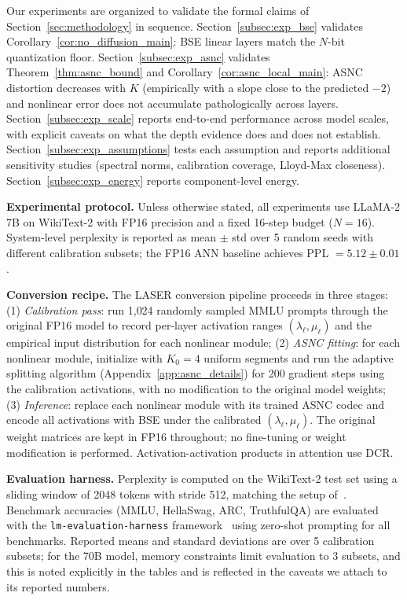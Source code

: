\documentclass{article}
\theoremstyle{plain}
\theoremstyle{definition}
\theoremstyle{remark}
\begin{document}
Our experiments are organized to validate the formal claims of
Section~\ref{sec:methodology} in sequence.
Section~\ref{subsec:exp_bse} validates Corollary~\ref{cor:no_diffusion_main}:
BSE linear layers match the $N$-bit quantization floor.
Section~\ref{subsec:exp_asnc} validates Theorem~\ref{thm:asnc_bound}
and Corollary~\ref{cor:asnc_local_main}: ASNC distortion decreases with $K$
(empirically with a slope close to the predicted $-2$) and nonlinear error does
not accumulate pathologically across layers.
Section~\ref{subsec:exp_scale} reports end-to-end performance across model
scales, with explicit caveats on what the depth evidence does and does not
establish.
Section~\ref{subsec:exp_assumptions} tests each assumption and reports
additional sensitivity studies (spectral norms, calibration coverage, Lloyd-Max
closeness). Section~\ref{subsec:exp_energy} reports component-level energy.

\noindent\textbf{Experimental protocol.}
Unless otherwise stated, all experiments use LLaMA-2 7B on WikiText-2 with FP16
precision and a fixed 16-step budget ($N = 16$). System-level perplexity is
reported as mean $\pm$ std over 5 random seeds with different calibration
subsets; the FP16 ANN baseline achieves PPL $= 5.12 \pm 0.01$.

\noindent\textbf{Conversion recipe.}
The LASER conversion pipeline proceeds in three stages: (1) \emph{Calibration
pass}: run 1{,}024 randomly sampled MMLU prompts through the original FP16
model to record per-layer activation ranges $(\lambda_\ell, \mu_\ell)$ and the
empirical input distribution for each nonlinear module; (2) \emph{ASNC fitting}:
for each nonlinear module, initialize with $K_0 = 4$ uniform segments and run
the adaptive splitting algorithm (Appendix~\ref{app:asnc_details}) for 200
gradient steps using the calibration activations, with no modification to the
original model weights; (3) \emph{Inference}: replace each nonlinear module
with its trained ASNC codec and encode all activations with BSE under the
calibrated $(\lambda_\ell, \mu_\ell)$. The original weight matrices are kept in
FP16 throughout; no fine-tuning or weight modification is performed.
Activation-activation products in attention use DCR.

\noindent\textbf{Evaluation harness.}
Perplexity is computed on the WikiText-2 test set using a sliding window of
2048 tokens with stride 512, matching the setup of~\citet{press2022train}.
Benchmark accuracies (MMLU, HellaSwag, ARC, TruthfulQA) are evaluated with the
\texttt{lm-evaluation-harness} framework~\citep{eval-harness} using zero-shot
prompting for all benchmarks. Reported means and standard deviations are over
5 calibration subsets; for the 70B model, memory constraints limit evaluation
to 3 subsets, and this is noted explicitly in the tables and is reflected in
the caveats we attach to its reported numbers.
\end{document}
